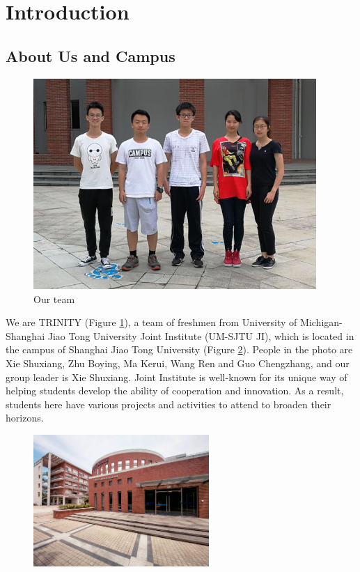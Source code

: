 \section{Introduction}

\subsection{About Us and Campus}


\begin{figure}[htbp]
\centering
\includegraphics[height=8cm]{picture/teamMember}
  \caption{Our team \label{fig:teamMember}}
\end{figure}

We are TRINITY (Figure \ref{fig:teamMember}), a team of freshmen from University of
Michigan-Shanghai Jiao Tong University Joint Institute (UM-SJTU JI), which is
located in the campus of Shanghai Jiao Tong University (Figure
\ref{fig:campus}). People in the photo are Xie Shuxiang, Zhu Boying, Ma Kerui,
Wang Ren and Guo Chengzhang, and our group leader is Xie Shuxiang. Joint
Institute is well-known for its unique way of helping students develop the
ability of cooperation and innovation. As a result, students here have various
projects and activities to attend to broaden their horizons.  


\begin{figure}[htbp]
\centering
\includegraphics[height=5cm]{figure/campus}
  \caption{\label{fig:campus}}
\end{figure}

